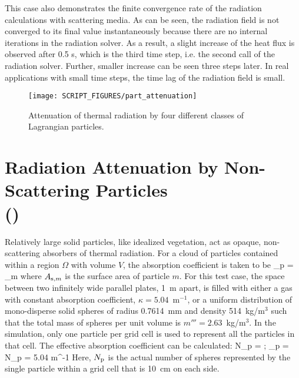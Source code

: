 \documentclass[11pt]{book}
\begin{document}
This case also demonstrates the finite convergence rate of the radiation calculations with scattering media. As can be seen, the radiation field is not converged to its final value instantaneously because there are no internal iterations in the radiation solver. As a result, a slight increase of the heat flux is observed after 0.5 s, which is the third time step, i.e. the second call of the radiation solver. Further, smaller increase can be seen three steps later. In real applications with small time steps, the time lag of the radiation field is small.

\begin{figure}[h]
\centering
\texttt{[image: SCRIPT\_FIGURES/part\_attenuation]}
\caption[Radiation attenuation by Lagrangian particles]{Attenuation of thermal radiation by four different classes of Lagrangian particles.}
\label{part_attenuation_figure}
\end{figure}


\section{Radiation Attenuation by Non-Scattering Particles \\ (\texorpdfstring{}{radiation\_gas-veg\_consistency})}
\label{radiation_gas-veg_consistency}
\label{radiation_gas-veg_consistency_gas}
\label{radiation_gas-veg_consistency_veg}

Relatively large solid particles, like idealized vegetation, act as opaque, non-scattering absorbers of thermal radiation. For a cloud of particles contained within a region $\Omega$ with volume $V$, the absorption coefficient is taken to be
\be
   \kappa_{\rm p} = \sum_{m \in \Omega} 
\ee
where $A_{{\rm s},m}$ is the surface area of particle $m$. For this test case, the space between two infinitely wide parallel plates, 1~m apart, is filled with either a gas with constant absorption coefficient, $\kappa=5.04$~m$^{-1}$, or a uniform distribution of mono-disperse solid spheres of radius 0.7614~mm and density 514~kg/m$^3$ such that the total mass of spheres per unit volume is $m'''=2.63$~kg/m$^3$. In the simulation, only one particle per grid cell is used to represent all the particles in that cell. The effective absorption coefficient can be calculated:
\be
   N_{\rm p} =  \quad ; \quad \kappa_{\rm p} = N_{\rm p}  = 5.04 \; \hbox{m}^{-1}
\ee
Here, $N_{\rm p}$ is the actual number of spheres represented by the single particle within a grid cell that is 10~cm on each side.
\end{document}
